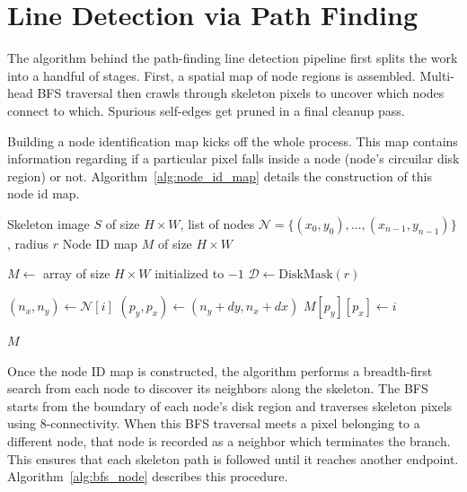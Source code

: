 \section{Line Detection via Path Finding}

The algorithm behind the path-finding line detection pipeline first splits the work into a handful of stages. First, a spatial map of node regions is assembled. Multi-head BFS traversal then crawls through skeleton pixels to uncover which nodes connect to which. Spurious self-edges get pruned in a final cleanup pass.

Building a node identification map kicks off the whole process. This map contains information regarding if a particular pixel falls inside a node (node's circuilar disk region) or not. Algorithm~\ref{alg:node_id_map} details the construction of this node id map.

\begin{algorithm}[H]
\caption{Build Node ID Map}
\label{alg:node_id_map}
\begin{algorithmic}[1]
\Require Skeleton image $S$ of size $H \times W$, list of nodes $\mathcal{N} = \{(x_0, y_0), \ldots, (x_{n-1}, y_{n-1})\}$, radius $r$
\Ensure Node ID map $M$ of size $H \times W$

\State $M \gets$ array of size $H \times W$ initialized to $-1$
\State $\mathcal{D} \gets \text{DiskMask}(r)$

    \State $(n_x, n_y) \gets \mathcal{N}[i]$
        \State $(p_y, p_x) \gets (n_y + dy, n_x + dx)$
            \State $M[p_y][p_x] \gets i$
        \EndIf
    \EndFor
\EndFor

\State \Return $M$
\end{algorithmic}
\end{algorithm}

Once the node ID map is constructed, the algorithm performs a breadth-first search from each node to discover its neighbors along the skeleton. The BFS starts from the boundary of each node's disk region and traverses skeleton pixels using 8-connectivity. When this BFS traversal meets a pixel belonging to a different node, that node is recorded as a neighbor which terminates the branch. This ensures that each skeleton path is followed until it reaches another endpoint. Algorithm~\ref{alg:bfs_node} describes this procedure.

